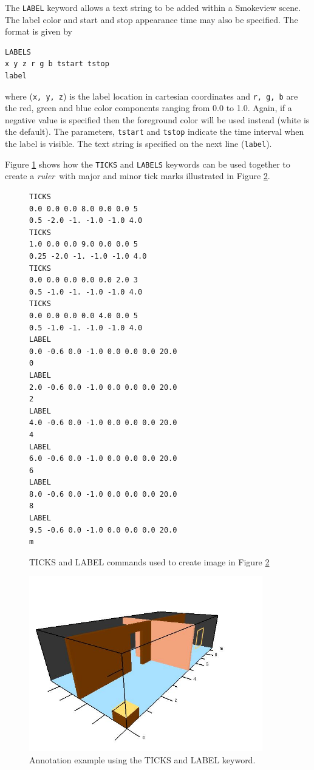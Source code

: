 \documentclass[11pt,twoside]{book}
\newcommand{\figoptions}{hbp}
\begin{document}
The {\tt LABEL} keyword allows a text string to be added
within a Smokeview scene.  The label color and start and
stop appearance time may also be specified. The format is
given by

\begin{verbatim}
LABELS
x y z r g b tstart tstop
label
\end{verbatim}

\noindent where ({\tt x, y, z}) is the label location in cartesian
coordinates and {\tt r, g, b} are the red, green and blue color
components ranging from 0.0 to 1.0.  Again, if a negative value is
specified then the foreground color will be used instead (white is
the default).  The parameters, {\tt tstart} and {\tt tstop}
indicate the time interval when the label is visible. The text
string is specified on the next line ({\tt label}).

Figure \ref{figticklabels} shows how the {\tt TICKS} and
{\tt LABELS} keywords can be used together to create a
{\em ruler}\ with major and minor tick marks illustrated in Figure
\ref{figticklabelexample}.

\begin{figure}[\figoptions]
{\small
\begin{verbatim}
TICKS
0.0 0.0 0.0 8.0 0.0 0.0 5
0.5 -2.0 -1. -1.0 -1.0 4.0
TICKS
1.0 0.0 0.0 9.0 0.0 0.0 5
0.25 -2.0 -1. -1.0 -1.0 4.0
TICKS
0.0 0.0 0.0 0.0 0.0 2.0 3
0.5 -1.0 -1. -1.0 -1.0 4.0
TICKS
0.0 0.0 0.0 0.0 4.0 0.0 5
0.5 -1.0 -1. -1.0 -1.0 4.0
LABEL
0.0 -0.6 0.0 -1.0 0.0 0.0 0.0 20.0
0
LABEL
2.0 -0.6 0.0 -1.0 0.0 0.0 0.0 20.0
2
LABEL
4.0 -0.6 0.0 -1.0 0.0 0.0 0.0 20.0
4
LABEL
6.0 -0.6 0.0 -1.0 0.0 0.0 0.0 20.0
6
LABEL
8.0 -0.6 0.0 -1.0 0.0 0.0 0.0 20.0
8
LABEL
9.5 -0.6 0.0 -1.0 0.0 0.0 0.0 20.0
m
\end{verbatim}
}
\caption{ TICKS and LABEL commands used to create image in Figure \ref{figticklabelexample}}
\label{figticklabels}%
\end{figure}

\begin{figure}[\figoptions]
\begin{center}
\includegraphics[height=3.0in]{figures/ticklabels}
\end{center}
\caption{ Annotation example using the TICKS and LABEL keyword. }
\label{figticklabelexample}%
\end{figure}
\end{document}
